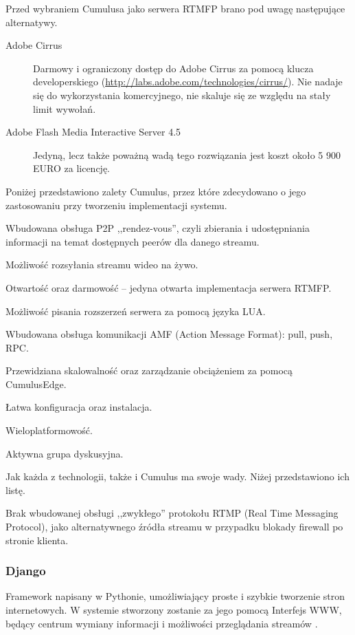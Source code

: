 Przed wybraniem Cumulusa jako serwera RTMFP brano pod uwagę następujące alternatywy.
\begin{description}
    \item[Adobe Cirrus] Darmowy i ograniczony dostęp do Adobe Cirrus za pomocą klucza developerskiego (\url{http://labs.adobe.com/technologies/cirrus/}). Nie nadaje się do wykorzystania komercyjnego, nie skaluje się ze względu na stały limit wywołań.
    \item[Adobe Flash Media Interactive Server 4.5] Jedyną, lecz także poważną wadą tego rozwiązania jest koszt około 5 900 EURO za licencję.
\end{description}

Poniżej przedstawiono zalety Cumulus, przez które zdecydowano o jego zastosowaniu przy tworzeniu implementacji systemu.
\begin{packed_item}
    \item{Wbudowana obsługa P2P ,,rendez-vous'', czyli zbierania i udostępniania informacji na temat dostępnych peerów dla danego streamu.}
    \item{Możliwość rozsyłania streamu wideo na żywo.}
    \item{Otwartość oraz darmowość -- jedyna otwarta implementacja serwera RTMFP.}
    \item{Możliwość pisania rozszerzeń serwera za pomocą języka LUA.}
    \item{Wbudowana obsługa komunikacji AMF (Action Message Format): pull, push, RPC.}
    \item{Przewidziana skalowalność oraz zarządzanie obciążeniem za pomocą CumulusEdge.}
    \item{Łatwa konfiguracja oraz instalacja.}
    \item{Wieloplatformowość.}
    \item{Aktywna grupa dyskusyjna.}
\end{packed_item}

Jak każda z technologii, także i Cumulus ma swoje wady. Niżej przedstawiono ich listę.
\begin{packed_item}
    \item{Brak wbudowanej obsługi ,,zwykłego'' protokołu RTMP (Real Time Messaging Protocol), jako alternatywnego źródła streamu w przypadku blokady firewall po stronie klienta.}
\end{packed_item}

\newpage
\subsubsection{Django}
Framework napisany w Pythonie, umożliwiający proste i szybkie tworzenie stron internetowych. W systemie stworzony zostanie za jego pomocą Interfejs WWW, będący centrum wymiany informacji i możliwości przeglądania streamów \cite{Django}.

